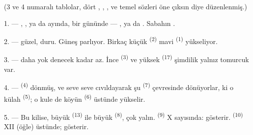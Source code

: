 %

\VUsaut{3.0mm}
\VUsaut{1.6mm}
\VUsaut{3.4mm}

(3 ve 4 numaralı tablolar, dört 
, , ,
 ve  temel sözleri öne çıksın diye
düzenlenmiş.)
\VUsaut{4.0mm}

\VUsaut{3.0mm}

\VUsaut{2.4mm}

\VUsaut{3.0mm}

1. --- , ,  ya da
 ayında,  bir gününde ---
,  ya da . Sabahın
.

2. ---  güzel,  duru. Güneş parlıyor. Birkaç küçük
 \textsuperscript{(2)} mavi 
\textsuperscript{(1)} yükseliyor.

3. ---  daha  yok denecek kadar az. İnce
 \textsuperscript{(3)} ve yüksek 
\textsuperscript{(17)} şimdilik yalnız tomurcuk var.

4. ---  \textsuperscript{(4)} dönmüş, ve seve seve
cıvıldayarak şu  \textsuperscript{(7)} çevresinde dönüyorlar,
ki o külah  \textsuperscript{(5)}; o kule de köyün
 \textsuperscript{(6)} üstünde yükselir.

\VUsaut{3.4mm}
\VUsaut{3.0mm}

5. --- Bu kilise, büyük  \textsuperscript{(13)} ile büyük
 \textsuperscript{(8)}, çok yalın. 
\textsuperscript{(9)} X sayısında:  gösterir.
 \textsuperscript{(10)} XII (öğle) üstünde; 
gösterir.

